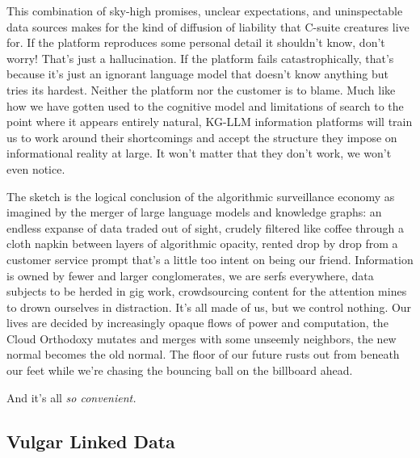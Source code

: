 This combination of sky-high promises, unclear expectations, and
uninspectable data sources makes for the kind of diffusion of liability
that C-suite creatures live for. If the platform reproduces some
personal detail it shouldn't know, don't worry! That's just a
hallucination. If the platform fails catastrophically, that's because
it's just an ignorant language model that doesn't know anything but
tries its hardest. Neither the platform nor the
customer is to blame. Much like how we have gotten used to the cognitive
model and limitations of search to the point where it appears entirely
natural, KG-LLM information platforms will train us to work around their
shortcomings and accept the structure they impose on informational
reality at large. It won't matter that they don't work, we won't even
notice.

The sketch is the logical conclusion of the algorithmic surveillance
economy as imagined by the merger of large language models and knowledge
graphs: an endless expanse of data traded out of sight, crudely filtered
like coffee through a cloth napkin between layers of algorithmic
opacity, rented drop by drop from a customer service prompt that's a
little too intent on being our friend. Information is owned by fewer and
larger conglomerates, we are serfs everywhere, data subjects to be
herded in gig work, crowdsourcing content for the attention mines to
drown ourselves in distraction. It's all made of us, but we control
nothing. Our lives are decided by increasingly opaque flows of power and
computation, the Cloud Orthodoxy mutates and merges with some unseemly
neighbors, the new normal becomes the old normal. The floor of our
future rusts out from beneath our feet while we're chasing the bouncing
ball on the billboard ahead.

And it's all \emph{so convenient.}

\hypertarget{vulgar-linked-data}{%
\subsection{Vulgar Linked Data}\label{vulgar-linked-data}}

